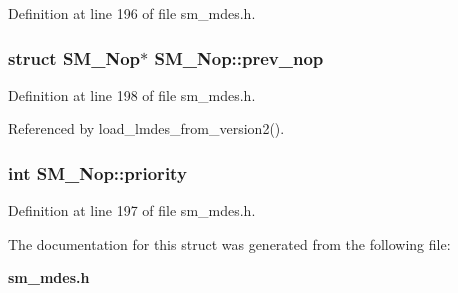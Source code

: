 Definition at line 196 of file sm\_\-mdes.h.
\subsubsection{\setlength{\rightskip}{0pt plus 5cm}struct \bf{SM\_\-Nop}$\ast$ \bf{SM\_\-Nop::prev\_\-nop}}\label{structSM__Nop_654d71c050b6840e78a1b6e817014ac8}




Definition at line 198 of file sm\_\-mdes.h.

Referenced by load\_\-lmdes\_\-from\_\-version2().
\subsubsection{\setlength{\rightskip}{0pt plus 5cm}int \bf{SM\_\-Nop::priority}}\label{structSM__Nop_71974a282b685814e878416643a259db}




Definition at line 197 of file sm\_\-mdes.h.

The documentation for this struct was generated from the following file:\begin{CompactItemize}
\item 
\bf{sm\_\-mdes.h}\end{CompactItemize}
